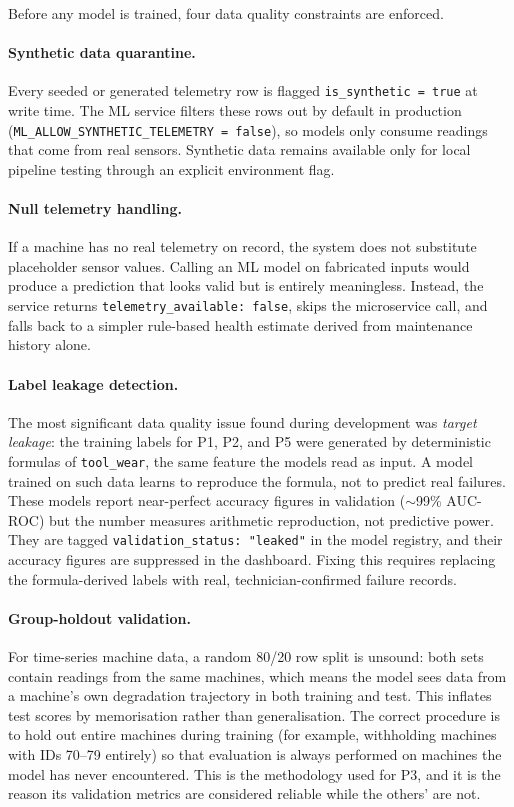 Before any model is trained, four data quality constraints are enforced.

\paragraph{Synthetic data quarantine.}
Every seeded or generated telemetry row is flagged \texttt{is\_synthetic = true} at write time. The ML service filters these rows out by default in production (\texttt{ML\_ALLOW\_SYNTHETIC\_TELEMETRY = false}), so models only consume readings that come from real sensors. Synthetic data remains available only for local pipeline testing through an explicit environment flag.

\paragraph{Null telemetry handling.}
If a machine has no real telemetry on record, the system does not substitute placeholder sensor values. Calling an ML model on fabricated inputs would produce a prediction that looks valid but is entirely meaningless. Instead, the service returns \texttt{telemetry\_available: false}, skips the microservice call, and falls back to a simpler rule-based health estimate derived from maintenance history alone.

\paragraph{Label leakage detection.}
The most significant data quality issue found during development was \emph{target leakage}: the training labels for P1, P2, and P5 were generated by deterministic formulas of \texttt{tool\_wear}, the same feature the models read as input. A model trained on such data learns to reproduce the formula, not to predict real failures. These models report near-perfect accuracy figures in validation ($\sim$99\% AUC-ROC) but the number measures arithmetic reproduction, not predictive power. They are tagged \texttt{validation\_status: "leaked"} in the model registry, and their accuracy figures are suppressed in the dashboard. Fixing this requires replacing the formula-derived labels with real, technician-confirmed failure records.

\paragraph{Group-holdout validation.}
For time-series machine data, a random 80/20 row split is unsound: both sets contain readings from the same machines, which means the model sees data from a machine's own degradation trajectory in both training and test. This inflates test scores by memorisation rather than generalisation. The correct procedure is to hold out entire machines during training (for example, withholding machines with IDs 70--79 entirely) so that evaluation is always performed on machines the model has never encountered. This is the methodology used for P3, and it is the reason its validation metrics are considered reliable while the others' are not.

